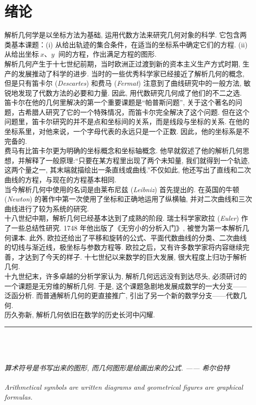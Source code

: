 
    \section{绪论}
    解析几何学是以坐标方法为基础, 运用代数方法来研究几何对象的科学. 它包含两类基本课题：(i) 从给出轨迹的集合条件，在适当的坐标系中确定它们的方程. (ii) 从给出坐标$\ x$、$y\ $ 间的方程，作出满足方程的图形. \\
    \indent 解析几何产生于十七世纪前期，当时欧洲正过渡到新的资本主义生产方式时期, 生产的发展推动了科学的进步. 当时的一些优秀科学家已经接近了解析几何的概念, 但是只有笛卡尔 ({\it Descartes}) 和费马 ({\it Fermat}) 注意到了曲线研究中的一般方法, 敏锐地发现了代数方法的必要和力量. 因此, 用代数研究几何成了他们的不二之选.\\
    \indent 笛卡尔在他的几何里解决的第一个重要课题是“帕普斯问题”, 关于这个著名的问题，古希腊人研究了它的一个特殊情况，而笛卡尔完全解决了这个问题. 但在这个问题里，笛卡尔研究的并不是点和坐标间的关系，而是线段与坐标的关系. 在他的坐标系里，对他来说，一个字母代表的永远只是一个正数. 因此，他的坐标系是不完备的. \\
    \indent 费马有比笛卡尔更为明确的坐标概念和坐标轴概念. 他早就叙述了他的解析几何思想，并解释了一般原理:“只要在某方程里出现了两个未知量, 我们就得到一个轨迹, 这两个量之一, 其末端就描绘出一条直线或曲线.”不仅如此, 他还写出了直线和二次曲线的方程，与现在的方程基本相同.\\
    \indent 当今解析几何中使用的名词是由莱布尼兹 ({\it Leibniz}) 首先提出的. 在英国的牛顿 ({\it Newton}) 的著作中第一次使用了坐标和正确地运用了纵横轴, 并对二次曲线和三次曲线进行了较为系统的研究. \\
    \indent 十八世纪中期，解析几何已经基本达到了成熟的阶段. 瑞士科学家欧拉 ({\it Euler}) 作了一些总结性研究. 1748 年他出版了《无穷小的分析入门》, 被誉为第一本解析几何课本. 此外, 欧拉还给出了平移和旋转的公式、平面代数曲线的分类、二次曲线的切线与渐近线，极坐标与参数方程等. 欧拉之后，又有许多数学家将内容继续完善，才达到了今天的样子. 十七世纪以来数学的巨大发展, 很大程度上归功于解析几何. \\
    \indent 十九世纪末，许多卓越的分析学家认为, 解析几何远远没有到达尽头, 必须研讨的一个课题是无穷维的解析几何. 于是, 这个课题急剧地发展成数学的一大分支—— 泛函分析. 而普通解析几何的更直接推广, 引出了另一个新的数学分支——代数几何. \\
    \indent 历久弥新, 解析几何依旧在数学的历史长河中闪耀.\\
    {\noindent} \rule[-10pt]{17.5cm}{0.05em}\\ \\ \\
    {\it \indent 算术符号是书写出来的图形, 而几何图形是绘画出来的公式. \hfill —— 希尔伯特\\ \\
    \indent Arithmetical symbols are written diagrams and geometrical figures are graphical formulas. \\ }
    
